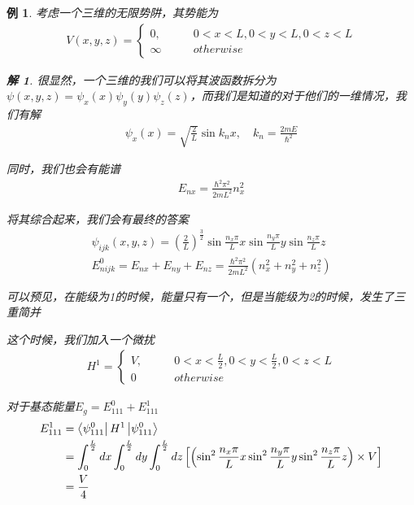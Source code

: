 \documentclass{article}
\newtheorem{example}{例}
\newtheorem{solution}{解}
\begin{document}
\begin{example}
    考虑一个三维的无限势阱，其势能为
    \begin{align*}
        V(x,y,z)=
        \begin{cases}
            0,&\quad\quad 0<x<L,0<y<L,0<z<L\\
            \infty&\quad\quad otherwise
        \end{cases}
    \end{align*}
    \begin{solution}
    很显然，一个三维的我们可以将其波函数拆分为$\psi(x,y,z)=\psi_x(x)\psi_y(y)\psi_z(z)$，而我们是知道的对于他们的一维情况，我们有解
    \begin{align*}
        \psi_{x}(x)=\sqrt{\frac{2}{L}}\sin{k_nx},\quad k_n=\frac{2mE}{\hbar^2}
    \end{align*}
    
    同时，我们也会有能谱
    \begin{align*}
        E_{nx}=\frac{\hbar^2\pi^2}{2mL^2}n_x^2
    \end{align*}

    将其综合起来，我们会有最终的答案
    \begin{align*}
        \psi_{ijk}(x,y,z)=\left(\frac{2}{L}\right)^{\frac{3}{2}}\sin{\frac{n_x\pi}{L}x}\sin{\frac{n_y\pi}{L}y}\sin{\frac{n_z\pi}{L}z}\\
        E_{n ijk}^0=E_{nx}+E_{ny}+E_{nz}=\frac{\hbar^2\pi^2}{2mL^2}\left(n_x^2+n_y^2+n_z^2\right)
    \end{align*}
    
    可以预见，在能级为1的时候，能量只有一个，但是当能级为2的时候，发生了三重简并

    这个时候，我们加入一个微扰
    \begin{align*}
        H^1=
        \begin{cases}
            V,&\quad\quad 0<x<\frac{L}{2},0<y<\frac{L}{2},0<z<L\\
            0&\quad\quad otherwise
        \end{cases}
    \end{align*}

    对于基态能量$E_g=E_{111}^0+E_{111}^1$
    \begin{align*}
        E_{111}^1&=\bra{\psi_{111}^0}H^1\ket{\psi_{111}^0}\\
        &=\int_{0}^{\frac{L}{2}} dx\int_{0}^{\frac{L}{2}} dy\int_{0}^{\frac{L}{2}} dz \left[\left(\sin^2{\frac{n_x\pi}{L}x}\sin^2{\frac{n_y\pi}{L}y}\sin^2{\frac{n_z\pi}{L}z}\right)\times V\right]\\
        &=\frac{V}{4}
    \end{align*}


\end{solution}
\end{example}
\end{document}
